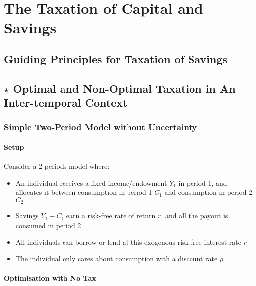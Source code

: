 \chapter{The Taxation of Capital and Savings}


\section{Guiding Principles for Taxation of Savings}


\section{$\star$ Optimal and Non-Optimal Taxation in An Inter-temporal Context}

    \subsection{Simple Two-Period Model without Uncertainty}

        \subsubsection{Setup}

            Consider a 2 periods model where:
            \begin{itemize}
                \item An individual receives a fixed income/endowment $Y_1$ in period 1, and allocates it between consumption in period 1 $C_1$ and consumption in period 2 $C_2$
                \item Savings $Y_1-C_1$ earn a risk-free rate of return $r$, and all the payout is consumed in period 2
                \item All individuals can borrow or lend at this exogenous risk-free interest rate $r$
                \item The individual only cares about consumption with a discount rate $\rho$
            \end{itemize}

        \subsubsection{Optimisation with No Tax}

